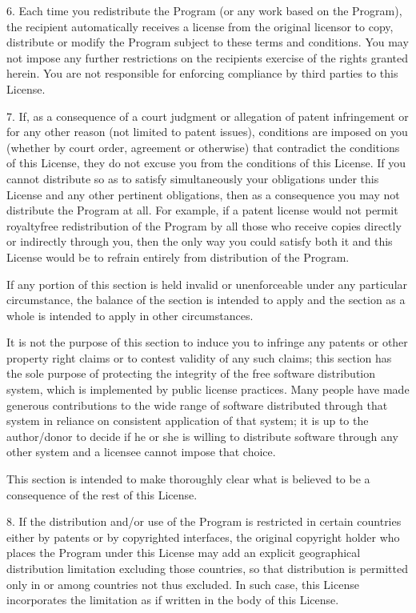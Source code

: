 \documentclass[letterpaper,10pt,english]{sphinxmanual}
\begin{document}
\begin{sphinxVerbatim}[commandchars=\\\{\}]
  6. Each time you redistribute the Program (or any work based on the
Program), the recipient automatically receives a license from the
original licensor to copy, distribute or modify the Program subject to
these terms and conditions.  You may not impose any further
restrictions on the recipients\PYGZsq{} exercise of the rights granted herein.
You are not responsible for enforcing compliance by third parties to
this License.

  7. If, as a consequence of a court judgment or allegation of patent
infringement or for any other reason (not limited to patent issues),
conditions are imposed on you (whether by court order, agreement or
otherwise) that contradict the conditions of this License, they do not
excuse you from the conditions of this License.  If you cannot
distribute so as to satisfy simultaneously your obligations under this
License and any other pertinent obligations, then as a consequence you
may not distribute the Program at all.  For example, if a patent
license would not permit royalty\PYGZhy{}free redistribution of the Program by
all those who receive copies directly or indirectly through you, then
the only way you could satisfy both it and this License would be to
refrain entirely from distribution of the Program.

If any portion of this section is held invalid or unenforceable under
any particular circumstance, the balance of the section is intended to
apply and the section as a whole is intended to apply in other
circumstances.

It is not the purpose of this section to induce you to infringe any
patents or other property right claims or to contest validity of any
such claims; this section has the sole purpose of protecting the
integrity of the free software distribution system, which is
implemented by public license practices.  Many people have made
generous contributions to the wide range of software distributed
through that system in reliance on consistent application of that
system; it is up to the author/donor to decide if he or she is willing
to distribute software through any other system and a licensee cannot
impose that choice.

This section is intended to make thoroughly clear what is believed to
be a consequence of the rest of this License.

  8. If the distribution and/or use of the Program is restricted in
certain countries either by patents or by copyrighted interfaces, the
original copyright holder who places the Program under this License
may add an explicit geographical distribution limitation excluding
those countries, so that distribution is permitted only in or among
countries not thus excluded.  In such case, this License incorporates
the limitation as if written in the body of this License.


\end{sphinxVerbatim}
\end{document}
